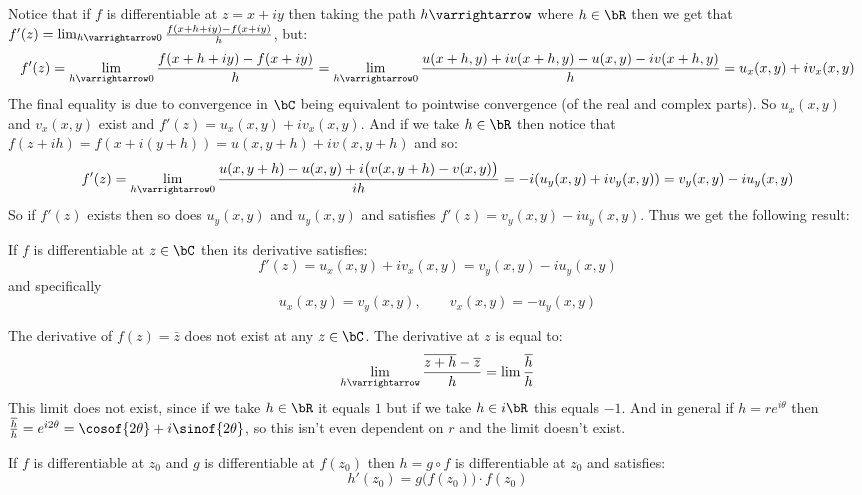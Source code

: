 \documentclass[10pt]{article}
\begin{document}
Notice that if $f$ is differentiable at $z=x+iy$ then taking the path $h\varrightarrow$ where $h\in\bR$ then we get that $f'(z)=\lim_{h\varrightarrow0}\frac{f(x+h+iy)-f(x+iy)}h$, but:
\[ f'(z)=\lim_{h\varrightarrow0}\frac{f(x+h+iy)-f(x+iy)}h = \lim_{h\varrightarrow0}\frac{u(x+h,y)+iv(x+h,y)-u(x,y)-iv(x+h,y)}h = u_x(x,y) + iv_x(x,y) \]
The final equality is due to convergence in $\bC$ being equivalent to pointwise convergence (of the real and complex parts).
So $u_x(x,y)$ and $v_x(x,y)$ exist and $f'(z)=u_x(x,y)+iv_x(x,y)$.
And if we take $h\in\bR$ then notice that $f(z+ih)=f(x+i(y+h))=u(x,y+h)+iv(x,y+h)$ and so:
\[ f'(z) = \lim_{h\varrightarrow0}\frac{u(x,y+h)-u(x,y) + i\bigl(v(x,y+h)-v(x,y)\bigr)}{ih} = -i(u_y(x,y) + iv_y(x,y)) = v_y(x,y) - iu_y(x,y) \]
So if $f'(z)$ exists then so does $u_y(x,y)$ and $u_y(x,y)$ and satisfies $f'(z)=v_y(x,y) - iu_y(x,y)$.
Thus we get the following result:

\begin{prop*}

    If $f$ is differentiable at $z\in\bC$ then its derivative satisfies:
    \[ f'(z) = u_x(x,y) + iv_x(x,y) = v_y(x,y) - iu_y(x,y) \]
    and specifically
    \[ u_x(x,y) = v_y(x,y),\qquad v_x(x,y) = -u_y(x,y) \]

\end{prop*}

\newpage
\begin{exam*}

    The derivative of $f(z)=\bar z$ does not exist at any $z\in\bC$.
    The derivative at $z$ is equal to:
    \[ \lim_{h\varrightarrow}\frac{\overline{z+h}-\overline z}h = \lim\frac{\overline h}h \]
    This limit does not exist, since if we take $h\in\bR$ it equals $1$ but if we take $h\in i\bR$ this equals $-1$.
    And in general if $h=re^{i\theta}$ then $\frac{\overline h}h = e^{i2\theta} = \cosof{2\theta}+i\sinof{2\theta}$, so this isn't even dependent on $r$ and the limit doesn't exist.

\end{exam*}


\begin{prop*}

    If $f$ is differentiable at $z_0$ and $g$ is differentiable at $f(z_0)$ then $h=g\circ f$ is differentiable at $z_0$ and satisfies:
    \[ h'(z_0) = g\bigl(f(z_0)\bigr)\cdot f(z_0) \]

\end{prop*}
\end{document}
